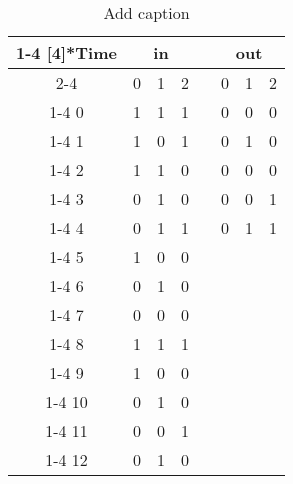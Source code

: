 \begin{table}[htbp]
	\centering
	\caption{Add caption}
	\begin{tabular}{|c|c|c|c|cccc}
		\cline{1-4}\cline{6-8}    \multirow{2}[4]{*}{Time} & \multicolumn{3}{c|}{in} & \multicolumn{1}{c|}{} & \multicolumn{3}{c|}{out} \bigstrut\\
		\cline{2-4}\cline{6-8}          & 0     & 1     & 2     & \multicolumn{1}{c|}{} & \multicolumn{1}{c|}{0} & \multicolumn{1}{c|}{1} & \multicolumn{1}{c|}{2} \bigstrut\\
		\cline{1-4}\cline{6-8}    0     & 1     & 1     & 1     & \multicolumn{1}{c|}{} & \multicolumn{1}{c|}{0} & \multicolumn{1}{c|}{0} & \multicolumn{1}{c|}{0} \bigstrut\\
		\cline{1-4}\cline{6-8}    1     & 1     & 0     & 1     & \multicolumn{1}{c|}{} & \multicolumn{1}{c|}{0} & \multicolumn{1}{c|}{1} & \multicolumn{1}{c|}{0} \bigstrut\\
		\cline{1-4}\cline{6-8}    2     & 1     & 1     & 0     & \multicolumn{1}{c|}{} & \multicolumn{1}{c|}{0} & \multicolumn{1}{c|}{0} & \multicolumn{1}{c|}{0} \bigstrut\\
		\cline{1-4}\cline{6-8}    3     & 0     & 1     & 0     & \multicolumn{1}{c|}{} & \multicolumn{1}{c|}{0} & \multicolumn{1}{c|}{0} & \multicolumn{1}{c|}{1} \bigstrut\\
		\cline{1-4}\cline{6-8}    4     & 0     & 1     & 1     & \multicolumn{1}{c|}{} & \multicolumn{1}{c|}{0} & \multicolumn{1}{c|}{1} & \multicolumn{1}{c|}{1} \bigstrut\\
		\cline{1-4}\cline{6-8}    5     & 1     & 0     & 0     &       &       &       &  \bigstrut\\
		\cline{1-4}    6     & 0     & 1     & 0     &       &       &       &  \bigstrut\\
		\cline{1-4}    7     & 0     & 0     & 0     &       &       &       &  \bigstrut\\
		\cline{1-4}    8     & 1     & 1     & 1     &       &       &       &  \bigstrut\\
		\cline{1-4}    9     & 1     & 0     & 0     &       &       &       &  \bigstrut\\
		\cline{1-4}    10    & 0     & 1     & 0     &       &       &       &  \bigstrut\\
		\cline{1-4}    11    & 0     & 0     & 1     &       &       &       &  \bigstrut\\
		\cline{1-4}    12    & 0     & 1     & 0     &       &       &       &  \bigstrut\\

\end{tabular}
\end{table}
